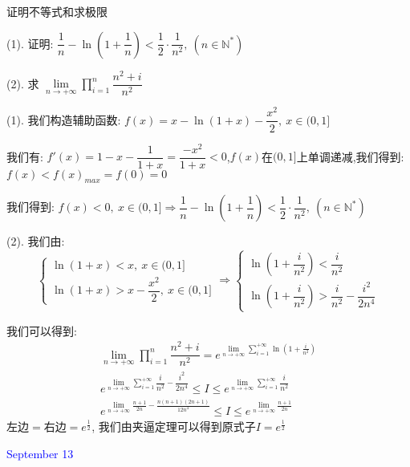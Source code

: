 \begin{example}[][Exam: 35.2.10]
	证明不等式和求极限

(1). 证明:  $\dfrac{1}{n}-\ln(1+\dfrac{1}{n})<\dfrac{1}{2}\cdot\dfrac{1}{n^2},\ (n\in\mathbb{N}^{*})$

(2). 求 $\lim\limits_{n\to+\infty}\prod\limits_{i=1}^{n}\dfrac{n^2+i}{n^2}$
\end{example}

\begin{solution}

	(1). 我们构造辅助函数:  $f(x)=x-\ln(1+x)-\dfrac{x^2}{2},\ x\in(0,1]$
	
	我们有:  $f'(x)=1-x-\dfrac{1}{1+x}=\dfrac{-x^2}{1+x}<0$,$f(x)$在$(0,1]$上单调递减,我们得到:  $f(x)<f(x)_{max}=f(0)=0$
	
	我们得到:  $f(x)<0,\ x\in(0,1]\Rightarrow \dfrac{1}{n}-\ln(1+\dfrac{1}{n})<\dfrac{1}{2}\cdot\dfrac{1}{n^2},\ (n\in\mathbb{N}^{*})$
	
	(2). 我们由:  
	$$\left\lbrace
	\begin{array}{l}
		\ln(1+x)<x,\ x\in(0,1]\\
		\ln(1+x)>x-\dfrac{x^2}{2},\ x\in(0,1]
	\end{array}
	\right. \Rightarrow \left\lbrace
	\begin{array}{l}
		\ln(1+\dfrac{i}{n^2})<\dfrac{i}{n^2}\\
		\ln(1+\dfrac{i}{n^2})>\dfrac{i}{n^2}-\dfrac{i^2}{2n^4}
	\end{array}
	\right. $$
	
	我们可以得到:  
	\begin{eqnarray*}
		\lim\limits_{n\to+\infty}\prod\limits_{i=1}^{n}\dfrac{n^2+i}{n^2}=e^{\lim\limits_{n\to+\infty}\sum\limits_{i=1}^{+\infty}\ln(1+\frac{i}{n^2})}\\
		e^{\lim\limits_{n\to+\infty}\sum\limits_{i=1}^{+\infty}\dfrac{i}{n^2}-\dfrac{i^2}{2n^4}}\leq I\leq e^{\lim\limits_{n\to+\infty}\sum\limits_{i=1}^{+\infty}\dfrac{i}{n^2}}\\
		e^{\lim\limits_{n\to+\infty}\frac{n+1}{2n}-\frac{n(n+1)(2n+1)}{12n^4}}\leq I\leq e^{\lim\limits_{n\to+\infty}\frac{n+1}{2n}}
	\end{eqnarray*}
	$\text{左边}=\text{右边}=e^{\frac{1}{2}}$,
	我们由夹逼定理可以得到原式子$I=e^{\frac{1}{2}}$
\end{solution}


\textcolor{blue}{September 13}


